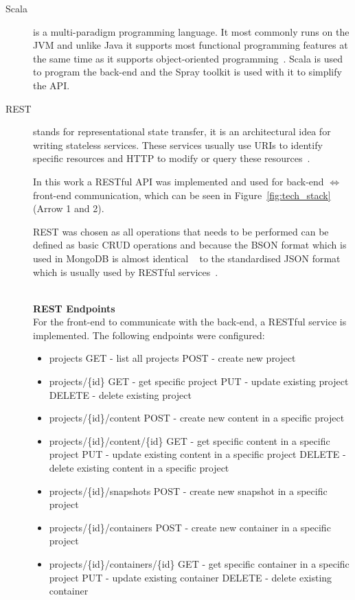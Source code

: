 \documentclass[a4paper,12pt]{article}
\newcommand{\Iff}{\Leftrightarrow}
\begin{document}
\begin{description}
\item[Scala]
is a multi-paradigm programming language. It most commonly runs on the JVM and unlike Java it
supports most functional programming features at the same time as it supports object-oriented
programming~\cite{SCALA}. Scala is used to program the back-end and the Spray toolkit is used with
it to simplify the API.

\item[REST]
stands for representational state transfer, it is an architectural idea for writing stateless
services. These services usually use URIs to identify specific resources and HTTP to modify or query
these resources~\cite{REST}. 

In this work a RESTful API was implemented and used for back-end $\Iff$ front-end
communication, which can be seen in Figure~\ref{fig:tech_stack} (Arrow 1 and 2).

REST was chosen as all operations that needs to be performed can be defined as basic CRUD operations
and because the BSON format which is used in MongoDB is almost identical ~\cite{BSON} to the
standardised JSON format which is usually used by RESTful services~\cite{JSON}. 

\hfill \\
\textbf{REST Endpoints} \label{sec:API} \hfill \\
For the front-end to communicate with the back-end, a RESTful service is implemented.
The following endpoints were configured:

\begin{itemize}
  \item projects
      \subitem GET - list all projects
      \subitem POST - create new project
  \item projects/\{id\}
      \subitem GET - get specific project
      \subitem PUT - update existing project
      \subitem DELETE - delete existing project
  \item projects/\{id\}/content
      \subitem POST - create new content in a specific project 
  \item projects/\{id\}/content/\{id\}
      \subitem GET - get specific content in a specific project
      \subitem PUT - update existing content in a specific project
      \subitem DELETE - delete existing content in a specific project

  \item projects/\{id\}/snapshots
      \subitem POST - create new snapshot in a specific project 

  \item projects/\{id\}/containers
      \subitem POST - create new container in a specific project 
  \item projects/\{id\}/containers/\{id\}
      \subitem GET - get specific container in a specific project
      \subitem PUT - update existing container
      \subitem DELETE - delete existing container
\end{itemize}


\end{description}
\end{document}
